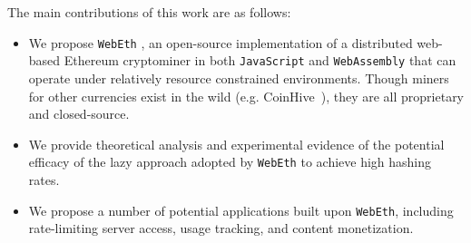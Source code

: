 \documentclass[runningheads]{llncs}
\newcommand{\trishita}[1]{}%
\begin{document}
The main contributions of this work are as follows:
\begin{itemize}
\item We propose \verb|WebEth| \cite{WebEth}, an open-source implementation of a distributed web-based Ethereum cryptominer in both \verb|JavaScript| and \verb|WebAssembly| that can operate under relatively resource constrained environments. Though miners for other currencies exist in the wild (e.g. CoinHive~\cite{coinhive}), they are all proprietary and closed-source.
\item We provide theoretical analysis and experimental evidence of the potential efficacy of the lazy approach adopted by \verb|WebEth| to achieve high hashing rates.
\item We propose a number of potential applications built upon \verb|WebEth|, including rate-limiting server access, usage tracking, and content monetization.
\end{itemize}


\end{document}
